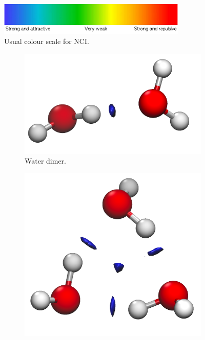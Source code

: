 \begin{figure}[h!]
\centering
\includegraphics[width=0.8\textwidth]{4/plots/nci/escalita_NCI_colorines.png}
\caption{Usual colour scale for NCI.}
\label{escala_deColorines}
\end{figure}

\begin{figure}[h!]
  \centering
  \begin{subfigure}[b]{0.32\linewidth}
    \includegraphics[width=\linewidth]{4/plots/nci/new/dimeroNCI}
    \caption{Water dimer.}
  \end{subfigure}
  \begin{subfigure}[b]{0.32\linewidth}
    \includegraphics[width=\linewidth]{4/plots/nci/new/trimer}

\end{subfigure}
\end{figure}
